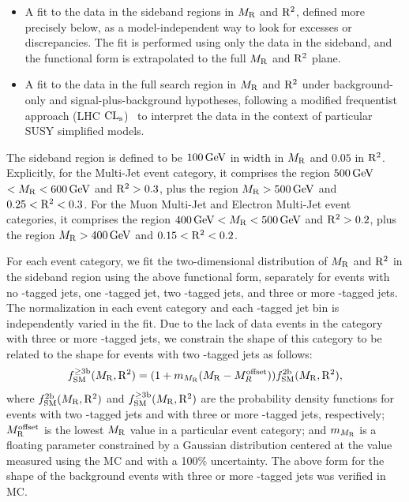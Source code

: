 \begin{itemize}
  \item A fit to the data in the sideband regions in $M_\mathrm{R}$ and 
    $\mathrm{R}^2$, defined more precisely below, as a model-independent way to look for excesses or 
    discrepancies. The fit is performed using only the data in the 
    sideband, and the functional form is extrapolated to the full $M_\mathrm{R}$ and $\mathrm{R}^2$ plane.
  \item A fit to the data in the full search region in $M_\mathrm{R}$ and $\mathrm{R}^2$ under  
    background-only and signal-plus-background hypotheses, following 
    a modified frequentist approach (LHC $\mathrm{CL}_\mathrm{s}$)~\cite{Read:2002hq,Read:2000ru,Cowan:2010js,ATLAS:2011tau} 
    to interpret the data in the context of particular SUSY simplified models. 
\end{itemize}

The sideband region is defined to be $100 \,\text{Ge\hspace{-.08em}V}$ in width in $M_\mathrm{R}$
and $0.05$ in $\mathrm{R}^2$. Explicitly, for the
Multi-Jet event category, it comprises the region $500 \,\text{Ge\hspace{-.08em}V}$
$< M_\mathrm{R} < 600 \,\text{Ge\hspace{-.08em}V}$ and $\mathrm{R}^2 > 0.3$, plus the region $M_\mathrm{R} > 500 \,\text{Ge\hspace{-.08em}V}$
and $0.25 < \mathrm{R}^2 < 0.3$.  For the Muon Multi-Jet and Electron Multi-Jet
event categories, it comprises the region $400 \,\text{Ge\hspace{-.08em}V} < M_\mathrm{R} < 500 \,\text{Ge\hspace{-.08em}V}$
and $\mathrm{R}^2 > 0.2$, plus the region $M_\mathrm{R} > 400 \,\text{Ge\hspace{-.08em}V}$ and
$0.15 < \mathrm{R}^2 < 0.2$. 

For each event category, we fit the two-dimensional distribution of 
$M_\mathrm{R}$ and $\mathrm{R}^2$ in the sideband region using the
above functional form, separately for events with no \PQb-tagged jets, one
\PQb-tagged jet, two \PQb-tagged jets, and three or more \PQb-tagged jets. The
normalization in each event category and each \PQb-tagged jet bin is
independently varied in the fit. Due to the lack of data events in the category
with three or more \PQb-tagged jets, we constrain
the shape of this category to be related to the shape for events with two
\PQb-tagged jets as follows:
\begin{equation}
  f^{\geq 3\mathrm{b}}_{\mathrm{SM}}(M_\mathrm{R}, \mathrm{R}^2)  = (1+m_{M_\mathrm{R}}(M_\mathrm{R} - M^{\mathrm{offset}}_R))f^{2\mathrm{b}}_{\mathrm{SM}}(M_\mathrm{R}, \mathrm{R}^2),
\label{eq:3btagFunction}
\end{equation}
where $f^{2\mathrm{b}}_{\mathrm{SM}}(M_\mathrm{R}, \mathrm{R}^2)$ and $f^{\geq 3\mathrm{b}}_{\mathrm{SM}}(M_\mathrm{R}, \mathrm{R}^2)$ are the
probability density functions for events with
two \PQb-tagged jets and with three or more \PQb-tagged jets,
respectively; $M_\mathrm{R}^{\mathrm{offset}}$ is the lowest $M_\mathrm{R}$ value in a particular
event category; and $m_{M_\mathrm{R}}$ is a floating parameter constrained by a Gaussian distribution
centered at the value measured using the MC and with a
100\% uncertainty. The above form for the shape of the background events 
with three or more \PQb-tagged jets was verified in MC.

